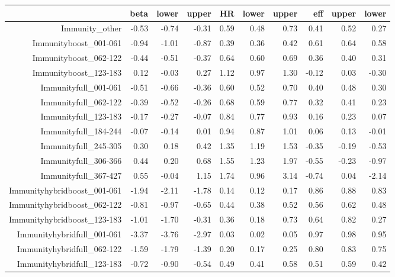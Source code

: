 \begin{table}[ht]
\centering
\begin{tabular}{rrrrrrrrrr}
  \hline
 & beta & lower & upper & HR & lower & upper & eff & upper & lower \\ 
  \hline
Immunity\_other & -0.53 & -0.74 & -0.31 & 0.59 & 0.48 & 0.73 & 0.41 & 0.52 & 0.27 \\ 
  Immunityboost\_001-061 & -0.94 & -1.01 & -0.87 & 0.39 & 0.36 & 0.42 & 0.61 & 0.64 & 0.58 \\ 
  Immunityboost\_062-122 & -0.44 & -0.51 & -0.37 & 0.64 & 0.60 & 0.69 & 0.36 & 0.40 & 0.31 \\ 
  Immunityboost\_123-183 & 0.12 & -0.03 & 0.27 & 1.12 & 0.97 & 1.30 & -0.12 & 0.03 & -0.30 \\ 
  Immunityfull\_001-061 & -0.51 & -0.66 & -0.36 & 0.60 & 0.52 & 0.70 & 0.40 & 0.48 & 0.30 \\ 
  Immunityfull\_062-122 & -0.39 & -0.52 & -0.26 & 0.68 & 0.59 & 0.77 & 0.32 & 0.41 & 0.23 \\ 
  Immunityfull\_123-183 & -0.17 & -0.27 & -0.07 & 0.84 & 0.77 & 0.93 & 0.16 & 0.23 & 0.07 \\ 
  Immunityfull\_184-244 & -0.07 & -0.14 & 0.01 & 0.94 & 0.87 & 1.01 & 0.06 & 0.13 & -0.01 \\ 
  Immunityfull\_245-305 & 0.30 & 0.18 & 0.42 & 1.35 & 1.19 & 1.53 & -0.35 & -0.19 & -0.53 \\ 
  Immunityfull\_306-366 & 0.44 & 0.20 & 0.68 & 1.55 & 1.23 & 1.97 & -0.55 & -0.23 & -0.97 \\ 
  Immunityfull\_367-427 & 0.55 & -0.04 & 1.15 & 1.74 & 0.96 & 3.14 & -0.74 & 0.04 & -2.14 \\ 
  Immunityhybridboost\_001-061 & -1.94 & -2.11 & -1.78 & 0.14 & 0.12 & 0.17 & 0.86 & 0.88 & 0.83 \\ 
  Immunityhybridboost\_062-122 & -0.81 & -0.97 & -0.65 & 0.44 & 0.38 & 0.52 & 0.56 & 0.62 & 0.48 \\ 
  Immunityhybridboost\_123-183 & -1.01 & -1.70 & -0.31 & 0.36 & 0.18 & 0.73 & 0.64 & 0.82 & 0.27 \\ 
  Immunityhybridfull\_001-061 & -3.37 & -3.76 & -2.97 & 0.03 & 0.02 & 0.05 & 0.97 & 0.98 & 0.95 \\ 
  Immunityhybridfull\_062-122 & -1.59 & -1.79 & -1.39 & 0.20 & 0.17 & 0.25 & 0.80 & 0.83 & 0.75 \\ 
  Immunityhybridfull\_123-183 & -0.72 & -0.90 & -0.54 & 0.49 & 0.41 & 0.58 & 0.51 & 0.59 & 0.42 \\ 

\end{tabular}
\end{table}
